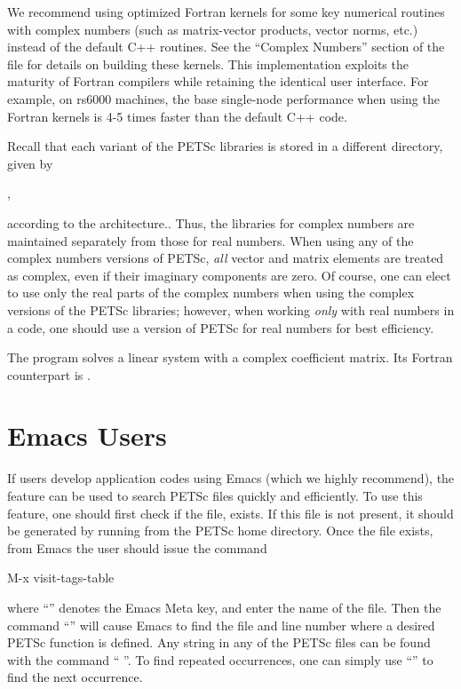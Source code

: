 {{{We recommend using optimized Fortran kernels for some key numerical
routines with complex numbers (such as matrix-vector products, vector
norms, etc.) instead of the default C++ routines.  See the ``Complex
Numbers'' section of the file  for
details on building these kernels.  This implementation exploits the
maturity of Fortran compilers while retaining the identical user
interface.  For example, on rs6000 machines, the base single-node
performance when using the Fortran kernels is 4-5 times faster than
the default C++ code.


Recall that each variant of the PETSc libraries is stored in a
different directory, given by
\begin{tabbing}
  ,
\end{tabbing}
according to the architecture.. Thus, the
libraries for complex
numbers are maintained separately from those for real
numbers.  When using any of the complex numbers versions of PETSc,
{\em all} vector and matrix elements are treated as complex,
even if their imaginary components are zero.
Of course, one can elect to use only the real parts of the complex
numbers when using the complex versions of the PETSc libraries;
however, when working {\em only} with real numbers in a code,
one should use a version of PETSc for real numbers for best efficiency.

The program 
solves a linear system with a complex
coefficient matrix.  Its Fortran counterpart is
.

\section{Emacs Users}  \label{sec_emacs}

 
If users develop application codes  using Emacs (which we
highly recommend), the  feature can be used to search PETSc 
files quickly and efficiently.  To use this feature, one should 
first check if the file,
 exists.  If this file is
not present, it should be generated by
running   from the PETSc home directory. 
Once the file exists, from 
Emacs the user should issue
the command 
\begin{tabbing}
 M-x visit-tags-table
\end{tabbing}
 where ``''
denotes the Emacs Meta key, and enter the 
name of the  file. Then the command ``'' will cause Emacs 
to find the file and line number where a desired PETSc function 
is defined.  Any string in any of the PETSc files can be found with the 
command `` ''. To find repeated occurrences, 
one can simply use ``'' to find the next occurrence.


}}}
